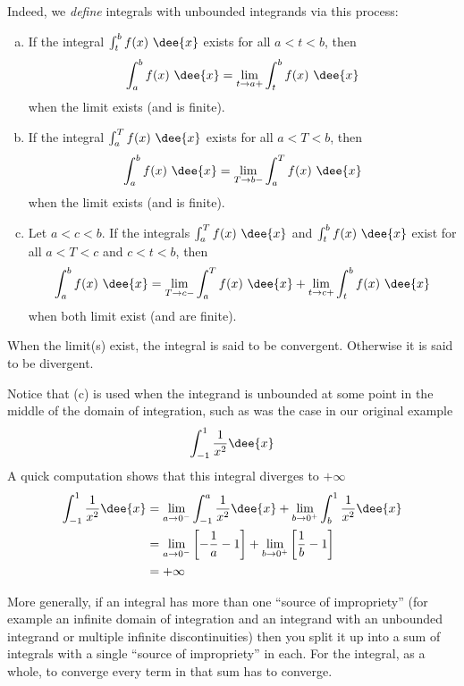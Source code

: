 Indeed, we \emph{define} integrals with unbounded integrands via this process:
\begin{defn}\label{def:IItype2}
\begin{enumerate}[(a)]
\item  If the integral $\int_t^b f(x)\ \dee{x}$ exists for all $a<t<b$, then
\begin{equation*}
\int_a^b f(x)\ \dee{x}=\lim_{t\rightarrow a+}\int_t^b f(x)\ \dee{x}
\end{equation*}
when the limit exists (and is finite).
\item  If the integral $\int_a^T f(x)\ \dee{x}$ exists for all $a<T<b$, then
\begin{equation*}
\int_a^b f(x)\ \dee{x}=\lim_{T\rightarrow b-}\int_a^T f(x)\ \dee{x}
\end{equation*}
when the limit exists (and is finite).
\item  Let $a<c<b$. If the integrals $\int_a^T f(x)\ \dee{x}$ and
$\int_t^b f(x)\ \dee{x}$ exist for all $a<T<c$ and $c<t<b$, then
\begin{equation*}
\int_a^b f(x)\ \dee{x}=\lim_{T\rightarrow c-}\int_a^T f(x)\ \dee{x}
+\lim_{t\rightarrow c+}\int_t^b f(x)\ \dee{x}
\end{equation*}
when both limit exist (and are finite).
\end{enumerate}
When the limit(s) exist, the integral is said to be convergent. Otherwise
it is said to be divergent.
\end{defn}
Notice that (c) is used when the integrand is unbounded at some point in the middle of
the domain of integration, such as was the case in our original example
\begin{align*}
  \int_{-1}^1 \frac{1}{x^2} \dee{x}
\end{align*}
A quick computation shows that this integral diverges to $+\infty$
\begin{align*}
  \int_{-1}^1 \frac{1}{x^2} \dee{x}
  &= \lim_{a \to 0^-} \int_{-1}^a \frac{1}{x^2} \dee{x}
  + \lim_{b \to 0^+} \int_b^1 \frac{1}{x^2}\dee{x} \\
  &= \lim_{a \to 0^-} \left[-\frac{1}{a} -1\right]
+ \lim_{b \to 0^+} \left[\frac{1}{b}-1 \right]\\
  &= + \infty
\end{align*}

More generally, if an integral has more than one ``source of impropriety'' (for example
an infinite domain of integration and an integrand with an unbounded integrand or multiple
infinite discontinuities) then you split it up into a sum of integrals with a single
``source of impropriety'' in each. For the integral, as a whole, to converge every term in
that sum has to converge.

